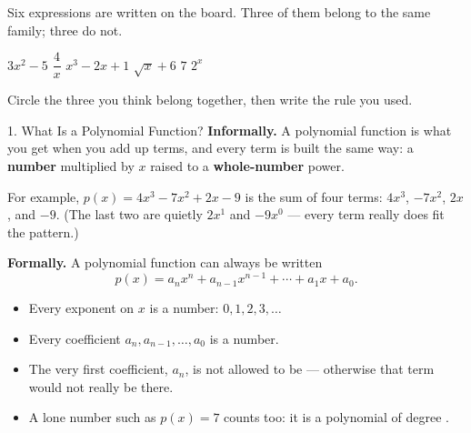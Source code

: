 \documentclass[10pt]{article}
\begin{document}
\vspace{0.1in}

\boxguard
\begin{hookbox}
Six expressions are written on the board. Three of them belong to the same family;
three do not.

\begin{center}
$3x^2 - 5$ \qquad $\dfrac{4}{x}$ \qquad $x^3 - 2x + 1$ \qquad
$\sqrt{x} + 6$ \qquad $7$ \qquad $2^x$
\end{center}

Circle the three you think belong together, then write the rule you used.
\end{hookbox}

\vspace{0.1in}

\boxguard
\begin{notesbox}{1. What Is a Polynomial Function?}
\textbf{Informally.} A polynomial function is what you get when you add up terms,
and every term is built the same way: a \textbf{number} multiplied by $x$ raised to
a \textbf{whole-number} power.

\medskip
For example, $p(x) = 4x^3 - 7x^2 + 2x - 9$ is the sum of four terms:
$4x^3$, \; $-7x^2$, \; $2x$, \; and $-9$.
(The last two are quietly $2x^1$ and $-9x^0$ --- every term really does fit the
pattern.)

\medskip
\textbf{Formally.} A polynomial function can always be written
\[
  p(x) = a_n x^n + a_{n-1}x^{n-1} + \cdots + a_1 x + a_0 .
\]

\begin{itemize}[itemsep=4pt]
  \item Every exponent on $x$ is a  number: $0, 1, 2, 3, \ldots$
  \item Every coefficient $a_n, a_{n-1}, \ldots, a_0$ is a  number.
  \item The very first coefficient, $a_n$, is not allowed to be 
        --- otherwise that term would not really be there.
  \item A lone number such as $p(x) = 7$ counts too: it is a polynomial of degree
        .
\end{itemize}
\end{notesbox}

\vspace{0.1in}
\end{document}
